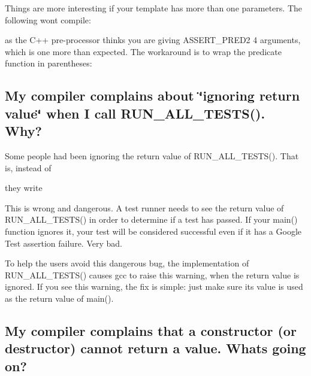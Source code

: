 Things are more interesting if your template has more than one parameters. The following won\textquotesingle{}t compile\+:


\begin{DoxyCode}{0}
\end{DoxyCode}


as the C++ pre-\/processor thinks you are giving {\ttfamily A\+S\+S\+E\+R\+T\+\_\+\+P\+R\+E\+D2} 4 arguments, which is one more than expected. The workaround is to wrap the predicate function in parentheses\+:


\begin{DoxyCode}{0}
\end{DoxyCode}


\subsection*{My compiler complains about \char`\"{}ignoring return value\char`\"{} when I call R\+U\+N\+\_\+\+A\+L\+L\+\_\+\+T\+E\+S\+T\+S(). Why?}

Some people had been ignoring the return value of {\ttfamily R\+U\+N\+\_\+\+A\+L\+L\+\_\+\+T\+E\+S\+T\+S()}. That is, instead of


\begin{DoxyCode}{0}
\end{DoxyCode}


they write


\begin{DoxyCode}{0}
\end{DoxyCode}


This is wrong and dangerous. A test runner needs to see the return value of {\ttfamily R\+U\+N\+\_\+\+A\+L\+L\+\_\+\+T\+E\+S\+T\+S()} in order to determine if a test has passed. If your {\ttfamily main()} function ignores it, your test will be considered successful even if it has a Google Test assertion failure. Very bad.

To help the users avoid this dangerous bug, the implementation of {\ttfamily R\+U\+N\+\_\+\+A\+L\+L\+\_\+\+T\+E\+S\+T\+S()} causes gcc to raise this warning, when the return value is ignored. If you see this warning, the fix is simple\+: just make sure its value is used as the return value of {\ttfamily main()}.

\subsection*{My compiler complains that a constructor (or destructor) cannot return a value. What\textquotesingle{}s going on?}

